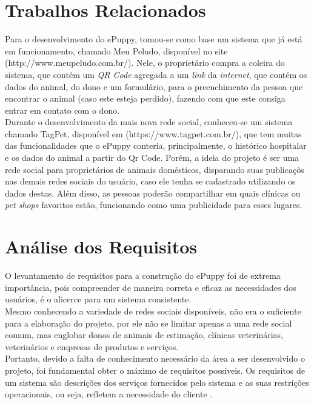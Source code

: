 \section{Trabalhos Relacionados}
Para o desenvolvimento do ePuppy, tomou-se como base um sistema que já está em funcionamento, chamado Meu Peludo, disponível no site (http://www.meupeludo.com.br/). Nele, o proprietário compra a coleira do sistema, que contém um {\it QR Code} agregada a um {\it link} da {\it internet}, que contém os dados do animal, do dono e um formulário, para o preenchimento da pessoa que encontrar o animal (caso este esteja perdido), fazendo com que este consiga entrar em contato com o dono. %
\\
\indent
Durante o desenvolvimento da mais nova rede social, conheceu-se um sistema chamado TagPet, disponível em (https://www.tagpet.com.br/), que tem muitas das funcionalidades que o ePuppy conteria, principalmente, o histórico hospitalar e os dados do animal a partir do Qr Code. Porém, a ideia do projeto é ser uma rede social para proprietários de animais domésticos, disparando suas publicaçõs nas demais redes sociais do usuário, caso ele tenha se cadastrado utilizando os dados destas. Além disso, as pessoas poderão compartilhar em quais clínicas ou {\it pet shops} favoritos estão, funcionando como uma publicidade para esses lugares.


\section{Análise dos Requisitos}
O levantamento de requisitos para a construção do ePuppy foi de extrema importância, pois compreender de maneira correta e eficaz as necessidades dos usuários, é o alicerce para um sistema consistente. 
\\
\indent
Mesmo conhecendo a variedade de redes sociais disponíveis, não era o suficiente para a elaboração do projeto, por ele não se limitar apenas a uma rede social comum, mas englobar donos de animais de estimação, clínicas veterinárias, veterinários e empresas de produtos e serviços.
\\
\indent
Portanto, devido a falta de conhecimento necessário da área a ser desenvolvido o projeto, foi fundamental obter o máximo de requisitos possíveis. Os requisitos de um sistema são descrições dos serviços fornecidos pelo sistema e as suas restrições operacionais, ou seja, refletem a necessidade do cliente \cite{Sommerville2011}.


